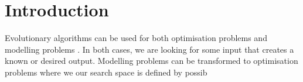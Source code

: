 \section{Introduction}
Evolutionary algorithms can be used for both optimisation problems and modelling problems \cite{BOOK:GA}. In both cases, we are looking for some input that creates a known or desired output. Modelling problems can be transformed to optimisation problems where we our search space is defined by possib
